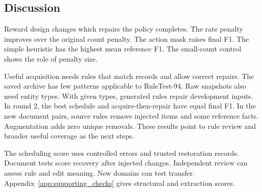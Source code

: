 \subsection{Discussion}

Reward design changes which repairs the policy completes. The rate
penalty improves over the original count penalty. The action mask raises
final F1. The simple heuristic has the highest mean reference F1.
The small-count control shows the role of penalty size.

Useful acquisition needs rules that match records and allow correct
repairs. The saved archive has few patterns applicable to RuleTest-94.
Raw snapshots also need entity types. With given types, generated rules
repair development inputs. In round 2, the best schedule and
acquire-then-repair have equal final F1. In the new document pairs,
source rules remove injected items and some reference facts.
Augmentation adds zero unique removals. These results point to rule
review and broader useful coverage as the next steps.

The scheduling score uses controlled errors and trusted restoration
records. Document tests score recovery after injected changes.
Independent review can assess rule and edit meaning. New domains can
test transfer. Appendix~\ref{app:supporting_checks} gives structural
and extraction scores.
